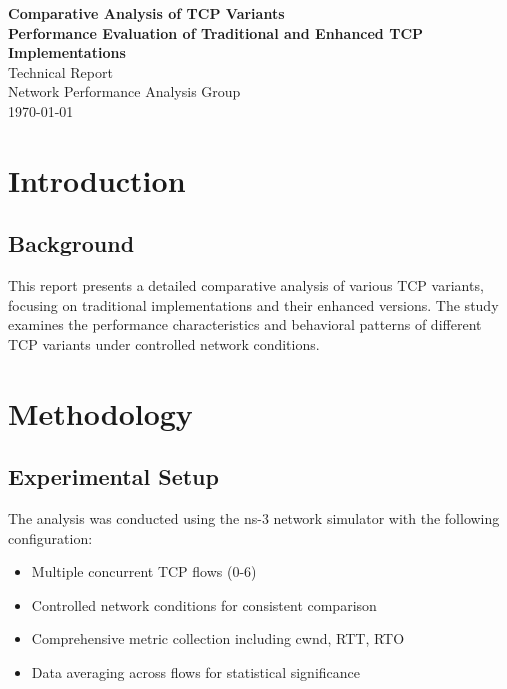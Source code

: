 \documentclass[12pt,a4paper]{report}
\begin{document}
\begin{titlepage}
\begin{center}
{\Huge\bfseries Comparative Analysis of TCP Variants\\[1.5cm]}
{\Large\bfseries Performance Evaluation of Traditional and Enhanced TCP Implementations\\[1cm]}
\vfill
{\large Technical Report\\[0.5cm]}
{\large Network Performance Analysis Group\\[0.5cm]}
{\large \today}
\end{center}
\end{titlepage}

\tableofcontents
\newpage

\chapter{Introduction}
\section{Background}
This report presents a detailed comparative analysis of various TCP variants, focusing on traditional implementations and their enhanced versions. The study examines the performance characteristics and behavioral patterns of different TCP variants under controlled network conditions.\n

\chapter{Methodology}
\section{Experimental Setup}
The analysis was conducted using the ns-3 network simulator with the following configuration:
\begin{itemize}
\item Multiple concurrent TCP flows (0-6)
\item Controlled network conditions for consistent comparison
\item Comprehensive metric collection including cwnd, RTT, RTO
\item Data averaging across flows for statistical significance
\end{itemize}
\end{document}
